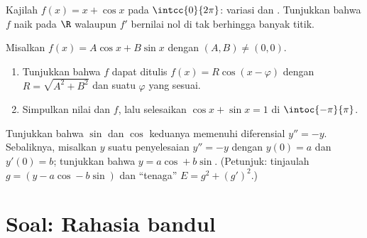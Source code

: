 \begin{exercise}[$\star\star$]\label{exo:g12:trigo:7}
Kajilah  $f(x) = x + \cos x$ pada $\intcc{0}{2\pi}$: variasi dan
. Tunjukkan bahwa $f$ naik pada $\R$ walaupun $f'$ bernilai
nol di tak berhingga banyak titik.
\end{exercise}

\begin{exercise}[$\star\star\star$]\label{exo:g12:trigo:8}
Misalkan $f(x) = A\cos x + B \sin x$ dengan $(A,B) \neq (0,0)$.
\begin{enumerate}
  \item Tunjukkan bahwa $f$ dapat ditulis $f(x) = R\cos(x - \varphi)$ dengan
        $R = \sqrt{A^2 + B^2}$ dan suatu $\varphi$ yang sesuai.
  \item Simpulkan nilai  dan  $f$, lalu selesaikan
        $\cos x + \sin x = 1$ di $\intoc{-\pi}{\pi}$.
\end{enumerate}
\end{exercise}

\begin{exercise}[$\star\star\star$]\label{exo:g12:trigo:9}
Tunjukkan bahwa $\sin$ dan $\cos$ keduanya memenuhi  diferensial
$y'' = -y$. Sebaliknya, misalkan $y$ suatu penyelesaian $y'' = -y$ dengan
$y(0) = a$ dan $y'(0) = b$; tunjukkan bahwa $y = a\cos + b\sin$.
(Petunjuk: tinjaulah $g = (y - a\cos - b\sin)$ dan ``tenaga''
$E = g^2 + (g')^2$.)
\end{exercise}

\section{Soal: Rahasia bandul}

